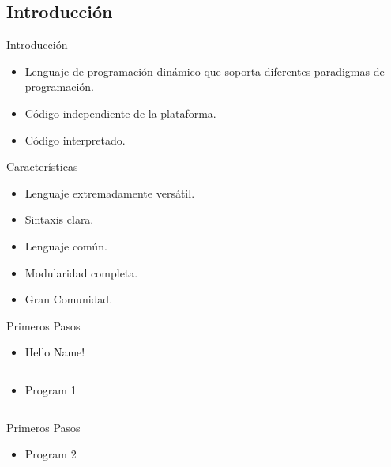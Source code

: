 \documentclass[usenames, dvipsnames, compress]{beamer}
\begin{document}
\subsection{Introducción}
\begin{frame}{Introducción}
\begin{itemize}[<+- | alert@ +>]
	\item Lenguaje de programación dinámico que soporta diferentes paradigmas de programación.
	\item Código independiente de la plataforma.
	\item Código interpretado.
\end{itemize}
\end{frame}
\begin{frame}{Características}
\begin{itemize}[<+- | alert@+>]
\item Lenguaje extremadamente versátil.
\item Sintaxis clara.
\item Lenguaje común.
\item Modularidad completa.
\item Gran Comunidad.
\end{itemize}
\end{frame}
\begin{frame}{Primeros Pasos}
\begin{itemize}
\item [] \begin{block}{Hello Name!}
\inputminted[xleftmargin=\parindent,linenos]{octave}{codes/hello.py}
\end{block}
\pause
\item [] \begin{block}{Program 1}
\inputminted[xleftmargin=\parindent,linenos]{python}{codes/program1.py}
\end{block}
\end{itemize}
\end{frame}
\begin{frame}{Primeros Pasos}
\begin{itemize}
\item []
\begin{block}{Program 2}
\inputminted[xleftmargin=\parindent,linenos]{python}{codes/program2.py}
\end{block}
\end{itemize}
\end{frame}
\end{document}
